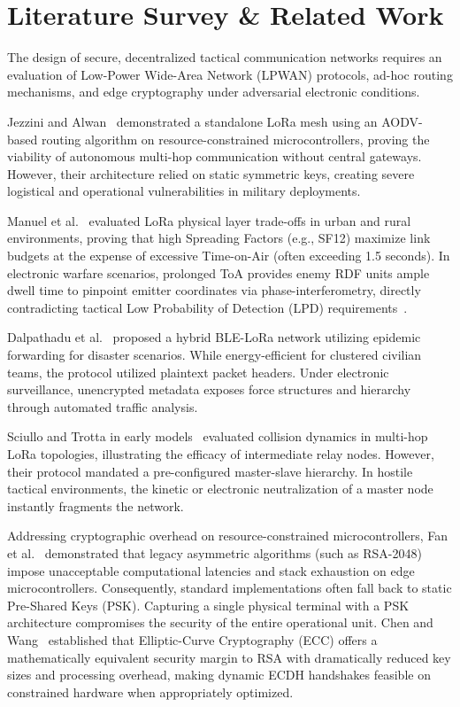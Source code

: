 \documentclass[conference]{IEEEtran}
\begin{document}
\section{Literature Survey \& Related Work}
The design of secure, decentralized tactical communication networks requires an evaluation of Low-Power Wide-Area Network (LPWAN) protocols, ad-hoc routing mechanisms, and edge cryptography under adversarial electronic conditions.

Jezzini and Alwan~\cite{jezzini2026} demonstrated a standalone LoRa mesh using an AODV-based routing algorithm on resource-constrained microcontrollers, proving the viability of autonomous multi-hop communication without central gateways. However, their architecture relied on static symmetric keys, creating severe logistical and operational vulnerabilities in military deployments.

Manuel et al.~\cite{manuel2022} evaluated LoRa physical layer trade-offs in urban and rural environments, proving that high Spreading Factors (e.g., SF12) maximize link budgets at the expense of excessive Time-on-Air (often exceeding 1.5 seconds). In electronic warfare scenarios, prolonged ToA provides enemy RDF units ample dwell time to pinpoint emitter coordinates via phase-interferometry, directly contradicting tactical Low Probability of Detection (LPD) requirements~\cite{hassan2024}.

Dalpathadu et al.~\cite{dalpathadu2021} proposed a hybrid BLE-LoRa network utilizing epidemic forwarding for disaster scenarios. While energy-efficient for clustered civilian teams, the protocol utilized plaintext packet headers. Under electronic surveillance, unencrypted metadata exposes force structures and hierarchy through automated traffic analysis.

Sciullo and Trotta in early models~\cite{jezzini2026} evaluated collision dynamics in multi-hop LoRa topologies, illustrating the efficacy of intermediate relay nodes. However, their protocol mandated a pre-configured master-slave hierarchy. In hostile tactical environments, the kinetic or electronic neutralization of a master node instantly fragments the network.

Addressing cryptographic overhead on resource-constrained microcontrollers, Fan et al.~\cite{fan2023} demonstrated that legacy asymmetric algorithms (such as RSA-2048) impose unacceptable computational latencies and stack exhaustion on edge microcontrollers. Consequently, standard implementations often fall back to static Pre-Shared Keys (PSK). Capturing a single physical terminal with a PSK architecture compromises the security of the entire operational unit. Chen and Wang~\cite{chen2025} established that Elliptic-Curve Cryptography (ECC) offers a mathematically equivalent security margin to RSA with dramatically reduced key sizes and processing overhead, making dynamic ECDH handshakes feasible on constrained hardware when appropriately optimized.
\end{document}
